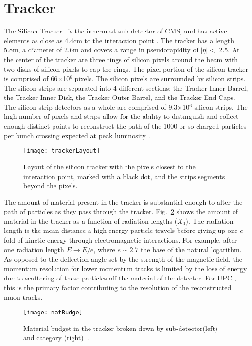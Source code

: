   \section{Tracker}
    The Silicon Tracker~\cite{CMS:2000aa} is the innermost sub-detector of CMS, and has active
    	elements as close as 4.4cm to the interaction point \cite{tCmsE}. 
    The tracker has a length 5.8m, a diameter of 2.6m and
    	covers a range in pseudorapidity of $|\eta| <$ 2.5.
    At the center of the tracker are three rings of silicon pixels around the beam 
    	with two disks of silicon pixels to cap the rings.
    The pixel portion of the silicon tracker is comprised of 66$\times$10$^{6}$
    	pixels.
    The silicon pixels are surrounded by silicon strips.
    The silicon strips are separated into 4 different sections: 
    	the Tracker Inner Barrel, the Tracker Inner Disk, the Tracker Outer 
    	Barrel, and the Tracker End Caps.
    The silicon strip detectors as a whole are comprised of 9.3$\times$10$^{6}$ silicon 
    	strips.
    The high number of pixels and strips allow for the ability to distinguish
    	and collect enough distinct points to reconstruct the path of the 1000
    	or so charged particles per bunch crossing expected at peak luminosity
    	\cite{tCmsE}.
    \begin{figure}[!Hhbt]
      \centering
      \texttt{[image: trackerLayout]}
      \caption{Layout of the silicon tracker with the pixels closest to the 
        interaction point, marked with a black dot, and the strips segments 
        beyond the pixels.}
      \label{fig:fig:trackerLayout}
    \end{figure}

    The amount of material present in the tracker is substantial enough to
      alter the path of particles as they pass through the tracker. 
    Fig.~\ref{fig:matBudge} shows the amount of material in the tracker 
      as a function of radiation lengths ($X_{0}$).
    The radiation length is the mean distance a high energy particle travels 
      before giving up one $e$-fold of kinetic energy through electromagnetic
    	interactions.
    For example, after one radiation length $E \rightarrow E/e$, where 
    	$e \sim 2.7$ the base of the natural logarithm. 
    As opposed to the deflection angle set by the strength of the magnetic 
      field, the momentum resolution for lower momentum tracks is limited by 
      the lose of energy due to scattering of these particles off the material 
      of the detector.
    For UPC \JPsi{}, this is the primary factor contributing to the resolution 
      of the reconstructed muon tracks. 
    \begin{figure}[!Hhbt]
      \centering
      \texttt{[image: matBudge]}
      \caption{Material budget in the tracker broken down by sub-detector(left) and
        category (right)~\cite{tCmsE}.}
      \label{fig:matBudge}
    \end{figure}

